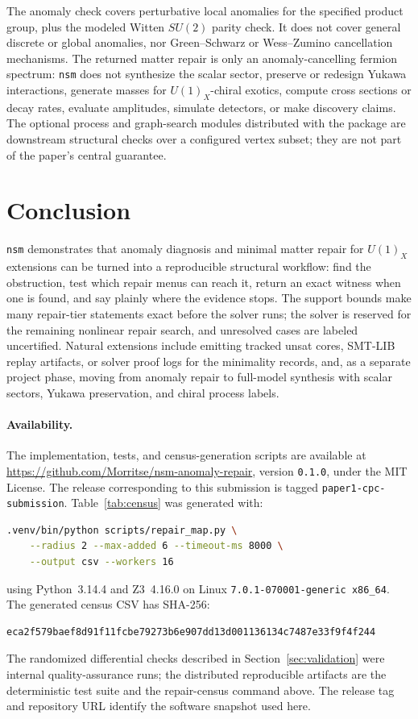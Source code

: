 \documentclass[11pt]{article}
\newcommand{\nsm}{\texttt{nsm}}
\newcommand{\UX}{U(1)_X}
\newcommand{\SUtwo}{SU(2)}
\begin{document}
The anomaly check covers perturbative local anomalies for the specified product
group, plus the modeled Witten $\SUtwo$ parity check. It does not cover general
discrete or global anomalies, nor Green--Schwarz or Wess--Zumino cancellation
mechanisms. The returned matter repair is only an anomaly-cancelling fermion
spectrum: \nsm{} does not synthesize the scalar sector, preserve or redesign
Yukawa interactions, generate masses for $\UX$-chiral exotics, compute cross
sections or decay rates, evaluate amplitudes, simulate detectors, or make
discovery claims. The optional process and graph-search modules distributed with
the package are downstream structural checks over a configured vertex subset;
they are not part of the paper's central guarantee.

\section{Conclusion}

\nsm{} demonstrates that anomaly diagnosis and minimal matter repair for
$\UX$ extensions can be turned into a reproducible structural workflow: find the
obstruction, test which repair menus can reach it, return an exact witness when
one is found, and say plainly where the evidence stops. The support bounds make
many repair-tier statements exact before the solver runs; the solver is reserved
for the remaining nonlinear repair search, and unresolved cases are labeled
uncertified. Natural extensions include emitting tracked unsat cores, SMT-LIB
replay artifacts, or solver proof logs for the minimality records, and, as a
separate project phase, moving from anomaly repair to full-model synthesis with
scalar sectors, Yukawa preservation, and chiral process labels.

\paragraph{Availability.} The implementation, tests, and census-generation
scripts are available at
\url{https://github.com/Morritse/nsm-anomaly-repair}, version
\texttt{0.1.0}, under the MIT License. The release corresponding to this
submission is tagged \texttt{paper1-cpc-submission}. Table~\ref{tab:census}
was generated with:
\begin{lstlisting}[language=bash]
.venv/bin/python scripts/repair_map.py \
    --radius 2 --max-added 6 --timeout-ms 8000 \
    --output csv --workers 16
\end{lstlisting}
using Python~3.14.4 and Z3~4.16.0 on Linux
\texttt{7.0.1-070001-generic x86\_64}. The generated census CSV has SHA-256:
\begin{lstlisting}
eca2f579baef8d91f11fcbe79273b6e907dd13d001136134c7487e33f9f4f244
\end{lstlisting}
The randomized differential checks described in Section~\ref{sec:validation} were
internal quality-assurance runs; the distributed reproducible artifacts are the
deterministic test suite and the repair-census command above. The release tag
and repository URL identify the software snapshot used here.
\end{document}
